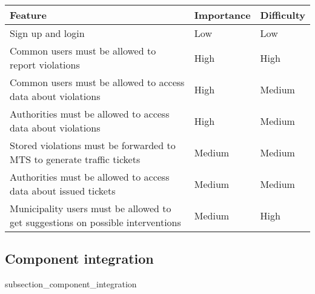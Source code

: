 \documentclass[./main.tex]{subfiles}
\begin{document}
\begin{table}[H]
\centering
\begin{tabularx}{\textwidth}{|X|l|l|}
\hline
Feature & Importance & Difficulty\tabularnewline
\hline
Sign up and login & Low & Low\tabularnewline
Common users must be allowed to report violations & High &
High\tabularnewline
Common users must be allowed to access data about violations & High &
Medium\tabularnewline
Authorities must be allowed to access data about violations & High &
Medium\tabularnewline
Stored violations must be forwarded to MTS to generate traffic tickets & Medium
& Medium\tabularnewline
Authorities must be allowed to access data about issued tickets & Medium &
Medium\tabularnewline
Municipality users must be allowed to get suggestions on possible interventions
& Medium & High\tabularnewline
\hline
\end{tabularx}
\end{table}

\subsection{Component integration}

{subsection_component_integration}
\end{document}
